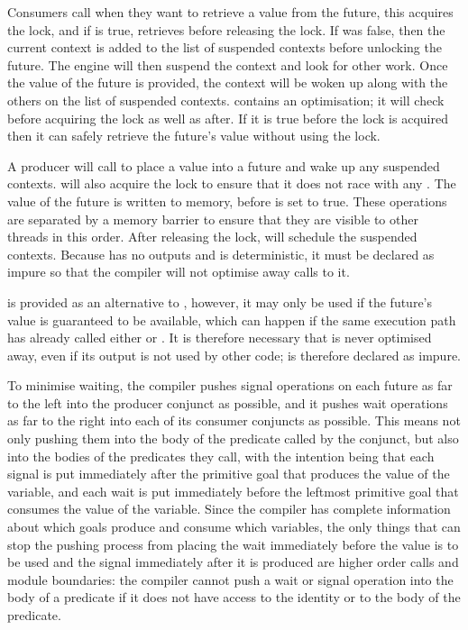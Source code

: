 Consumers call \wait when they want to retrieve a value from the future,
this acquires the lock, and if  is true, retrieves
 before releasing the lock.
If  was false, then the current context is added to
the list of suspended contexts before unlocking the future.
The engine will then suspend the context and look for other work.
Once the value of the future is provided,
the context will be woken up along with the others on the list of suspended contexts.
\wait contains an optimisation; it will check  before
acquiring the lock as well as after.
If it is true before the lock is acquired then it can safely retrieve the
future's value without using the lock.

A producer will call \signal to place a value into a future and wake up any
suspended contexts.
\signal will also acquire the lock to ensure that it does not race with any \wait.
The value of the future is written to memory,
before 
 is set to true.
These operations are separated by a memory barrier to ensure that they are
visible to other threads in this order.
After releasing the lock, \signal will schedule the suspended contexts.
Because \signal has no outputs and is deterministic,
it must be declared as impure so that the compiler will not optimise away calls
to it.

\get is provided as an alternative to \wait,
however, it may only be used if the future's value is guaranteed to be
available, which can happen if the same execution path has already called
either \signal or \wait.
It is therefore necessary that \wait is never optimised away, even if its
output is not used by other code;
\wait is therefore declared as impure.

To minimise waiting,
the compiler pushes signal operations on each future
as far to the left into the producer conjunct as possible,
and it pushes wait operations
as far to the right into each of its consumer conjuncts as possible.
This means not only pushing them
into the body of the predicate called by the conjunct,
but also into the bodies of the predicates they call,
with the intention being that
each signal is put immediately after
the primitive goal that produces the value of the variable,
and each wait is put immediately before
the leftmost primitive goal that consumes the value of the variable.
Since the compiler has complete information
about which goals produce and consume which variables,
the only things that can stop the pushing process from placing the
wait immediately before the value is to be used and the signal
immediately after it is produced are
higher order calls and module boundaries:
the compiler cannot push a wait or signal operation
into the body of a predicate
if it does not have access to the identity or to the body of the predicate.


